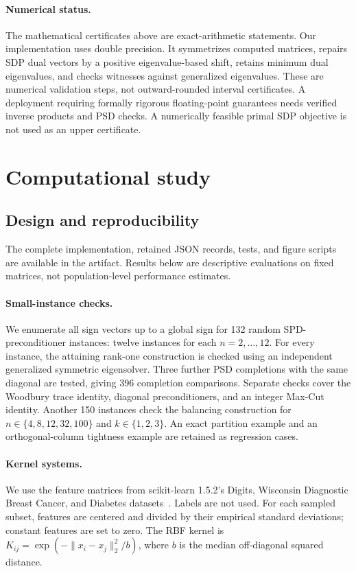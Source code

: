 \documentclass[final,leqno,letterpaper]{etna}
\begin{document}
\paragraph{Numerical status.}
The mathematical certificates above are exact-arithmetic statements. Our implementation uses double precision. It symmetrizes computed matrices, repairs SDP dual vectors by a positive eigenvalue-based shift, retains minimum dual eigenvalues, and checks witnesses against generalized eigenvalues. These are numerical validation steps, not outward-rounded interval certificates. A deployment requiring formally rigorous floating-point guarantees needs verified inverse products and PSD checks. A numerically feasible primal SDP objective is not used as an upper certificate.

\section{Computational study}
\subsection{Design and reproducibility}
The complete implementation, retained JSON records, tests, and figure scripts are available in the artifact. Results below are descriptive evaluations on fixed matrices, not population-level performance estimates.

\paragraph{Small-instance checks.}
We enumerate all sign vectors up to a global sign for 132 random SPD-preconditioner instances: twelve instances for each $n=2,\ldots,12$. For every instance, the attaining rank-one construction is checked using an independent generalized symmetric eigensolver. Three further PSD completions with the same diagonal are tested, giving 396 completion comparisons. Separate checks cover the Woodbury trace identity, diagonal preconditioners, and an integer Max-Cut identity. Another 150 instances check the balancing construction for $n\in\{4,8,12,32,100\}$ and $k\in\{1,2,3\}$. An exact partition example and an orthogonal-column tightness example are retained as regression cases.

\paragraph{Kernel systems.}
We use the feature matrices from scikit-learn 1.5.2's Digits, Wisconsin Diagnostic Breast Cancer, and Diabetes datasets~\cite{sklearn,street,efron}. Labels are not used. For each sampled subset, features are centered and divided by their empirical standard deviations; constant features are set to zero. The RBF kernel is
$K_{ij}=\exp(-\|x_i-x_j\|_2^2/b)$, where $b$ is the median off-diagonal squared distance.
\end{document}
